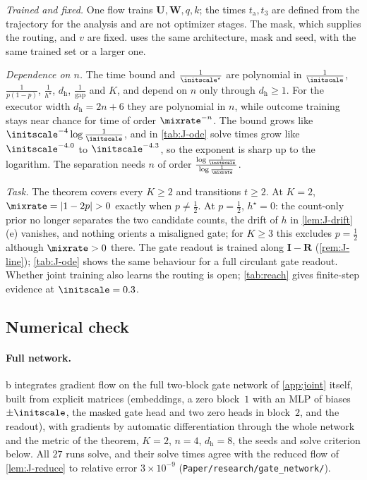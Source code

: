 \begin{remark}[Scope]
\label{rem:joint-scope}
\emph{Trained and fixed.} One flow trains $\mathbf U,\mathbf W,q,k$; the times $t_{\mathrm a},t_3$ are defined from the trajectory for the analysis and are not
optimizer stages. The mask, which supplies the routing, and $v$ are fixed.  uses the same architecture, mask and
seed, with the same trained set or a larger one.

\emph{Dependence on $n$.} The time bound and $\frac{1}{\initscale^\star}$ are polynomial in $\frac{1}{\initscale}$, $\frac{1}{p(1-p)}$, $\frac{1}{h^\star}$, $d_{\mathrm h}$, $\frac{1}{\mathrm{gap}}$ and $K$, and depend on
$n$ only through $d_{\mathrm h}\ge1$. For the executor width $d_{\mathrm h}=2n+6$ they are polynomial in $n$, while outcome training stays near chance for time of order $\mixrate^{-n}$. The bound grows like $\initscale^{-4}\log\frac{1}{\initscale}$, and in \cref{tab:J-ode} solve times grow like $\initscale^{-4.0}$ to $\initscale^{-4.3}$, so the exponent is
sharp up to the logarithm. The separation needs $n$ of order $\frac{\log\frac{1}{\initscale}}{\log\frac{1}{\mixrate}}$.

\emph{Task.} The theorem covers every $K\ge2$ and transitions $t\ge2$. At $K=2$, $\mixrate=|1-2p|>0$ exactly when $p\neq\frac{1}{2}$. At $p=\frac{1}{2}$,
$h^\star=0$: the count-only prior no longer separates the two candidate counts, the drift of $h$ in \cref{lem:J-drift}(e) vanishes, and
nothing orients a misaligned gate; for $K\ge3$ this excludes $p=\frac{1}{2}$ although $\mixrate>0$ there. The gate readout is trained along
$\mathbf I-\mathbf R$ (\cref{rem:J-line}); \cref{tab:J-ode} shows the same behaviour for a full circulant gate readout. Whether joint training also learns the routing is open;
\cref{tab:reach} gives finite-step evidence at $\initscale=0.3$.
\end{remark}

\subsection{Numerical check}
\label{app:J-check}
\paragraph{Full network.} b integrates gradient flow on the full two-block gate network of \cref{app:joint} itself, built
from explicit matrices (embeddings, a zero block~$1$ with an MLP of biases $\pm\initscale$, the masked gate head and two zero heads in
block~$2$, and the readout), with gradients by automatic differentiation through the whole network and the metric of the theorem, $K=2$,
$n=4$, $d_{\mathrm h}=8$, the seeds and solve criterion below. All $27$ runs solve, and their solve times agree with the reduced flow of
\cref{lem:J-reduce} to relative error $3\times10^{-9}$ (\texttt{Paper/research/gate\_network/}).

